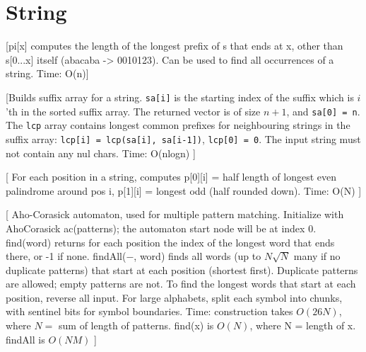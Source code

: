 \chapter{String}




[pi[x] computes the length of the longest prefix of s that ends at x, other than s[0...x] itself (abacaba -> 0010123).
 Can be used to find all occurrences of a string. Time: O(n)]

[Builds suffix array for a string. \texttt{sa[i]} is the starting index of the suffix which
 is $i$'th in the sorted suffix array. The returned vector is of size $n+1$, and \texttt{sa[0] = n}.
 The \texttt{lcp} array contains longest common prefixes for neighbouring strings in the suffix array:
 \texttt{lcp[i] = lcp(sa[i], sa[i-1])}, \texttt{lcp[0] = 0}. The input string must not contain any nul chars.
 Time: O(nlogn)
 ]


[
    For each position in a string, computes p[0][i] = half length of longest even 
    palindrome around pos i, p[1][i] = longest odd (half rounded down). Time: O(N)
]

[
    Aho-Corasick automaton, used for multiple pattern matching. Initialize with 
    AhoCorasick ac(patterns); the automaton start node will be at index 0. find(word) returns 
    for each position the index of the longest word that ends there, or -1 if none. findAll($-$, word) 
    finds all words (up to $N \sqrt N$ many if no duplicate patterns) that start at each position 
    (shortest first). Duplicate patterns are allowed; empty patterns are not. To find the longest 
    words that start at each position, reverse all input. For large alphabets, split each symbol into 
    chunks, with sentinel bits for symbol boundaries. Time: construction takes $O(26N)$, 
    where $N =$ sum of length of patterns. find(x) is $O(N)$, where N = length of x. findAll is $O(NM)$
]


